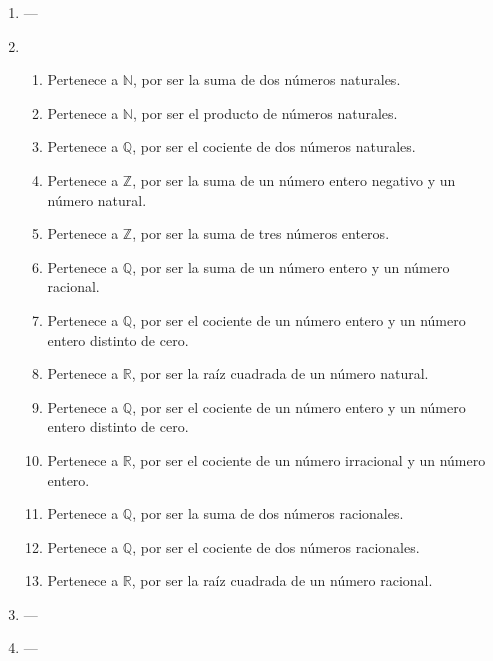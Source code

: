 \documentclass[a4paper]{article}
\newcommand{\exercise}{\item}
\begin{document}
\begin{enumerate}
\begin{enumerate} [label=(\alph*)]
		\item Correcto ya que $0$ puede escribirse como $2k$ con $k=0 \in \mathbb{Z}$
		\item Correcto ya que $30$ puede escribirse como $5k$ con $k=6 \in \mathbb{Z}$
		\item Incorrecto. $17$ no es múltiplo de 3 ya que no puede escribirse como $3k$ con $k \in \mathbb{Z}$
		\item Correcto ya que $-12$ puede escribirse como $4k$ con $k=-3 \in \mathbb{Z}$
		\item Correcto ya que $-12$ puede escribirse como $2k$ con $k=-6 \in \mathbb{Z}$
		\item Incorrecto. $11$ no es múltiplo de $-3$ ya que no puede escribirse como $-3k$ con $k \in \mathbb{Z}$
\end{enumerate}\exercise---\exercise\begin{enumerate} [label=(\alph*)]		\item Pertenece a $\mathbb{N}$, por ser la suma de dos números naturales.
		\item Pertenece a $\mathbb{N}$, por ser el producto de números naturales.
		\item Pertenece a $\mathbb{Q}$, por ser el cociente de dos números naturales. 
		\item Pertenece a $\mathbb{Z}$, por ser la suma de un número entero negativo y un número natural.
		\item Pertenece a $\mathbb{Z}$, por ser la suma de tres números enteros.
		\item Pertenece a $\mathbb{Q}$, por ser la suma de un número entero y un número racional.
		\item Pertenece a $\mathbb{Q}$, por ser el cociente de un número entero y un número entero distinto de cero.
		\item Pertenece a $\mathbb{R}$, por ser la raíz cuadrada de un número natural.
		\item Pertenece a $\mathbb{Q}$, por ser el cociente de un número entero y un número entero distinto de cero.
		\item Pertenece a $\mathbb{R}$, por ser el cociente de un número irracional y un número entero. 
		\item Pertenece a $\mathbb{Q}$, por ser la suma de dos números racionales.
		\item Pertenece a $\mathbb{Q}$, por ser el cociente de dos números racionales.
		\item Pertenece a $\mathbb{R}$, por ser la raíz cuadrada de un número racional.
\end{enumerate}\exercise---\exercise---\end{enumerate}
\end{document}
